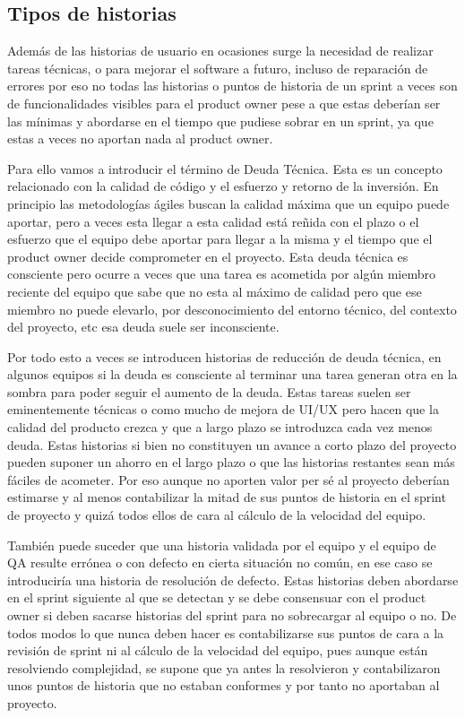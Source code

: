 \documentclass[../pfc.tex]{subfiles}
\begin{document}
	\subsection{Tipos de historias}
	
	Además de las historias de usuario en ocasiones surge la necesidad de realizar tareas técnicas, o para mejorar el software a futuro, incluso de reparación de errores por eso no todas las historias o puntos de historia de un sprint a veces son de funcionalidades visibles para el product owner pese a que estas deberían ser las mínimas y abordarse en el tiempo que pudiese sobrar en un sprint, ya que estas a veces no aportan nada al product owner.
	
	Para ello vamos a introducir el término de Deuda Técnica. Esta es un concepto relacionado con la calidad de código y el esfuerzo y retorno de la inversión. En principio las metodologías ágiles buscan la calidad máxima que un equipo puede aportar, pero a veces esta llegar a esta calidad está reñida con el plazo o el esfuerzo que el equipo debe aportar para llegar a la misma y el tiempo que el product owner decide comprometer en el proyecto. Esta deuda técnica es consciente pero ocurre a veces que una tarea es acometida por algún miembro reciente del equipo que sabe que no esta al máximo de calidad pero que ese miembro no puede elevarlo, por desconocimiento del entorno técnico, del contexto del proyecto, etc esa deuda suele ser inconsciente. 
	
	Por todo esto a veces se introducen historias de reducción de deuda técnica, en algunos equipos si la deuda es consciente al terminar una tarea generan otra en la sombra para poder seguir el aumento de la deuda. Estas tareas suelen ser eminentemente técnicas o como mucho de mejora de UI/UX pero hacen que la calidad del producto crezca y que a largo plazo se introduzca cada vez menos deuda. Estas historias si bien no constituyen un avance a corto plazo del proyecto pueden suponer un ahorro en el largo plazo o que las historias restantes sean más fáciles de acometer. Por eso aunque no aporten valor per sé al proyecto deberían estimarse y al menos contabilizar la mitad de sus puntos de historia en el sprint de proyecto y quizá todos ellos de cara al cálculo de la velocidad del equipo.
	
	También puede suceder que una historia validada por el equipo y el equipo de QA resulte errónea o con defecto en cierta situación no común, en ese caso se introduciría una historia de resolución de defecto. Estas historias deben abordarse en el sprint siguiente al que se detectan y se debe consensuar con el product owner si deben sacarse historias del sprint para no sobrecargar al equipo o no. De todos modos lo que nunca deben hacer es contabilizarse sus puntos de cara a la revisión de sprint ni al cálculo de la velocidad del equipo, pues aunque están resolviendo complejidad, se supone que ya antes la resolvieron y contabilizaron unos puntos de historia que no estaban conformes y por tanto no aportaban al proyecto. 
		
\end{document}
